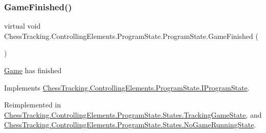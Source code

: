 \mbox{\label{class_chess_tracking_1_1_controlling_elements_1_1_program_state_1_1_program_state_a03a8db068264aa4ec11e8d473b6d3c46}} 
\subsubsection{\texorpdfstring{GameFinished()}{GameFinished()}}
{\footnotesize\ttfamily virtual void Chess\+Tracking.\+Controlling\+Elements.\+Program\+State.\+Program\+State.\+Game\+Finished (\begin{DoxyParamCaption}{ }\end{DoxyParamCaption})\hspace{0.3cm}{\ttfamily [virtual]}}



\mbox{\hyperlink{namespace_chess_tracking_1_1_game}{Game}} has finished 



Implements \mbox{\hyperlink{interface_chess_tracking_1_1_controlling_elements_1_1_program_state_1_1_i_program_state_a5c438d1bd53a0dd168eb56e20c482c1f}{Chess\+Tracking.\+Controlling\+Elements.\+Program\+State.\+I\+Program\+State}}.



Reimplemented in \mbox{\hyperlink{class_chess_tracking_1_1_controlling_elements_1_1_program_state_1_1_states_1_1_tracking_game_state_a66e4b6c89dab25aea56c4ca51b5f7b34}{Chess\+Tracking.\+Controlling\+Elements.\+Program\+State.\+States.\+Tracking\+Game\+State}}, and \mbox{\hyperlink{class_chess_tracking_1_1_controlling_elements_1_1_program_state_1_1_states_1_1_no_game_running_state_a9c8a27c252c9b474ab5357dbbf952bb1}{Chess\+Tracking.\+Controlling\+Elements.\+Program\+State.\+States.\+No\+Game\+Running\+State}}.

\mbox{\label{class_chess_tracking_1_1_controlling_elements_1_1_program_state_1_1_program_state_ae44259fd379473c103e8957d51832de9}} 
